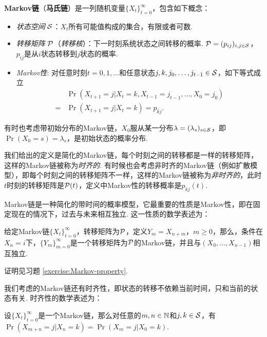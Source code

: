 \begin{definition}[Markov链]
\textbf{Markov链}（\textbf{马氏链}）是一列随机变量$\{X_t\}_{t=0}^{\infty}$，包含如下概念：
\begin{itemize}
	\item \textit{状态空间} $\mathcal S$：$X_t$所有可能值构成的集合，有限或者可数.
	\item \textit{转移矩阵} $\mathcal P$（\textit{转移核}）：下一时刻系统状态之间转移的概率. $\mathcal P=(p_{ij})_{i,j\in \mathcal S}$，$p_{ij}$是从$i$状态转移到$j$状态的概率.
	\item \textit{Markov性}: 对任意时刻$t=0,1,\dots$和任意状态$j,k,j_0,\dots,j_{t-1}\in \mathcal S$，如下等式成立
		\begin{align*}
		   &\Pr(X_{t+1}=j| X_t=k,X_{t-1}=j_{t-1},\dots,X_0=j_0)\\
           =&\Pr(X_{t+1}=j| X_{t}=k)=p_{kj}.
		\end{align*}
    \end{itemize}
    有时也考虑带初始分布的Markov链，$X_0$服从某一分布$\lambda=(\lambda_s)_{s\in \mathcal S}$，即$\Pr(X_0=s)=\lambda_s$，是初始状态的概率分布.
\end{definition}
我们给出的定义是简化的Markov链，每个时刻之间的转移都是一样的转移矩阵，这样的Markov链被称为\textit{时齐的}. 有时候也会考虑非时齐的Markov链（例如扩散模型），即每个时刻之间的转移矩阵不一样，这样的Markov链被称为\textit{非时齐的}，此时$t$时刻的转移矩阵是$\mathcal P(t)$，定义中Markov性的转移概率是$p_{kj}(t)$.

Markov链是一种简化的带时间的概率模型，它最重要的性质是Markov性，即在固定现在的情况下，过去与未来相互独立. 这一性质的数学表述为：
\begin{proposition}[Markov性]\label{proposition:markov}
给定Markov链$\{X_t\}_{t=0}^{\infty}$，转移矩阵为$\mathcal P$，定义$Y_m=X_{n+m}$，$m\geq 0$，那么，条件在$X_n=i$下，$\{Y_m\}_{m=0}^{\infty}$是一个转移矩阵为$\mathcal P$的Markov链，并且与$(X_0,\dots,X_{n-1})$相互独立.
\end{proposition}
证明见习题 \ref{exercise:Markov-property}.

我们考虑的Markov链还有时齐性，即状态的转移不依赖当前时间，只和当前的状态有关. 时齐性的数学表述为：
\begin{proposition}
    设$\{X_t\}_{t=0}^{\infty}$是一个Markov链，那么对任意的$m,n\in \mathbb{N}$和$j,k\in \mathcal S$，有
    $\Pr(X_{m+n}=j| X_{n}=k)=\Pr(X_{m}=j| X_{0}=k)$.
\end{proposition}

